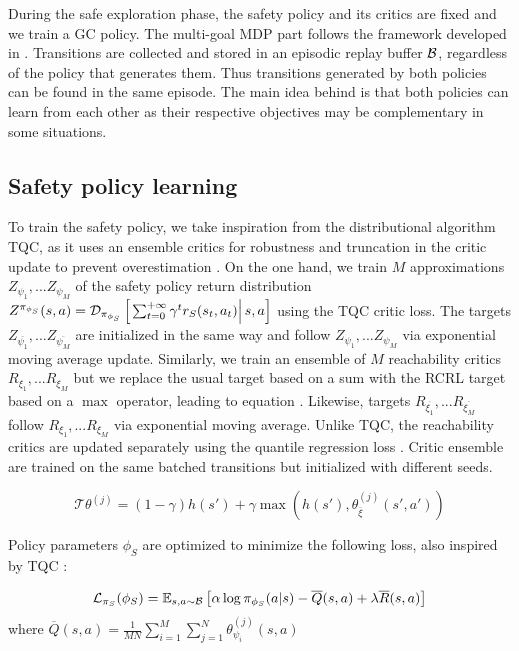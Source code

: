 During the safe exploration phase, the safety policy and its critics are fixed and we train a GC policy. 
The multi-goal MDP part follows the framework developed in . 
Transitions are collected and stored in an episodic replay buffer $\mathcal{B}$, regardless of the policy that generates them.
Thus transitions generated by both policies can be found in the same episode. The main idea behind is that both policies 
can learn from each other as their respective objectives may be complementary in some situations.

\subsection{Safety policy learning}
\label{subsection:safety_policy_learning}

To train the safety policy, we take inspiration from the distributional algorithm TQC, as it uses an ensemble critics for robustness and truncation in the critic update to prevent overestimation \cite{TQC}.
On the one hand, we train $M$ approximations $Z_{\psi_1}, ... Z_{\psi_M}$ of the safety policy return distribution $Z^{\pi_{\phi_S}}(s, a) = \mathcal{D}_{\pi_{\phi_S}} \left[ \left. \sum_{t=0}^{+\infty} \gamma^t r_S(s_t, a_t) \right| s, a \right]$ using the TQC critic loss. The targets $Z_{\overline{\psi_1}}, ... Z_{\overline{\psi_M}}$ are initialized in the same way and follow $Z_{\psi_1}, ... Z_{\psi_M}$ via exponential moving average update. 
Similarly, we train an ensemble of $M$ reachability critics $R_{\xi_1}, ... R_{\xi_M}$ but we replace the usual target based on a sum with the RCRL \cite{RCRL2022} target based on a $\max$ operator, leading to equation . 
Likewise, targets $R_{\overline{\xi_1}}, ... R_{\overline{\xi_M}}$ follow $R_{\xi_1}, ... R_{\xi_M}$ via exponential moving average. Unlike TQC, the reachability critics are updated separately using the quantile regression loss \cite{QR-DQN}.
Critic ensemble are trained on the same batched transitions but initialized with different seeds.

\begin{equation}
    \mathcal{T}\theta^{(j)} = (1-\gamma) h(s') + \gamma \max\left( h(s'), \theta_{\overline{\xi}}^{(j)}(s', a') \right)
    \label{eq:RCRL_target}
\end{equation}

Policy parameters $\phi_S$ are optimized to minimize the following loss, also inspired by TQC \cite{TQC}:

\begin{equation}
    \mathcal{L}_{\pi_S}(\phi_S) = \mathbb{E}_{\substack{s, a \sim \mathcal{B}}}
    \left[ \alpha \log \pi_{\phi_S}(a|s) - \overline{Q}(s, a) + \lambda \overline{R}(s, a) \right]
    \label{eq:safety_actor_loss}
\end{equation}
where $\overline{Q}(s, a) = \frac{1}{M N} \sum_{i = 1}^{M} \sum_{j = 1}^{N} \theta_{\psi_i}^{(j)}(s, a)$

